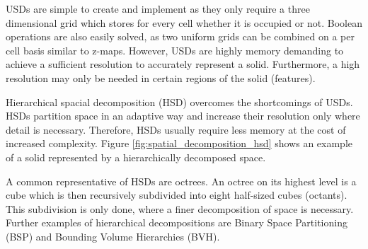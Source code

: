 \begin{description}
	USDs are simple to create and implement as they only require a three dimensional grid which stores for every cell whether it is occupied or not.
	Boolean operations are also easily solved, as two uniform grids can be combined on a per cell basis similar to z-maps.
	However, USDs are highly memory demanding to achieve a sufficient resolution to accurately represent a solid.
	Furthermore, a high resolution may only be needed in certain regions of the solid (\ie features).
	
	Hierarchical spacial decomposition (HSD) overcomes the shortcomings of USDs.
	HSDs partition space in an adaptive way and increase their resolution only where detail is necessary.
	Therefore, HSDs usually require less memory at the cost of increased complexity.
	Figure \ref{fig:spatial_decomposition_hsd} shows an example of a solid represented by a hierarchically decomposed space.
	
	A common representative of HSDs are octrees.
	An octree on its highest level is a cube which is then recursively subdivided into eight half-sized cubes (\aka octants).
	This subdivision is only done, where a finer decomposition of space is necessary.
	Further examples of hierarchical decompositions are Binary Space Partitioning (BSP) and Bounding Volume Hierarchies (BVH).
	

\end{description}
